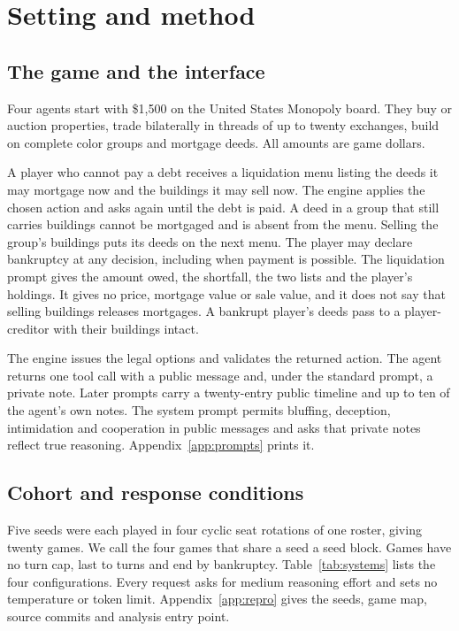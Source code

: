 \section{Setting and method}
\label{sec:setting}

\subsection{The game and the interface}
Four agents start with \$1,500 on the United States Monopoly board. They buy or auction properties, trade bilaterally in threads of up to twenty exchanges, build on complete color groups and mortgage deeds. All amounts are game dollars.

A player who cannot pay a debt receives a liquidation menu listing the deeds it may mortgage now and the buildings it may sell now. The engine applies the chosen action and asks again until the debt is paid. A deed in a group that still carries buildings cannot be mortgaged and is absent from the menu. Selling the group's buildings puts its deeds on the next menu. The player may declare bankruptcy at any decision, including when payment is possible. The liquidation prompt gives the amount owed, the shortfall, the two lists and the player's holdings. It gives no price, mortgage value or sale value, and it does not say that selling buildings releases mortgages. A bankrupt player's deeds pass to a player-creditor with their buildings intact.

The engine issues the legal options and validates the returned action. The agent returns one tool call with a public message and, under the standard prompt, a private note. Later prompts carry a twenty-entry public timeline and up to ten of the agent's own notes. The system prompt permits bluffing, deception, intimidation and cooperation in public messages and asks that private notes reflect true reasoning. Appendix~\ref{app:prompts} prints it.

\subsection{Cohort and response conditions}
Five seeds were each played in four cyclic seat rotations of one roster, giving twenty games. We call the four games that share a seed a seed block. Games have no turn cap, last  to  turns and end by bankruptcy. Table~\ref{tab:systems} lists the four configurations. Every request asks for medium reasoning effort and sets no temperature or token limit. Appendix~\ref{app:repro} gives the seeds, game map, source commits and analysis entry point.

